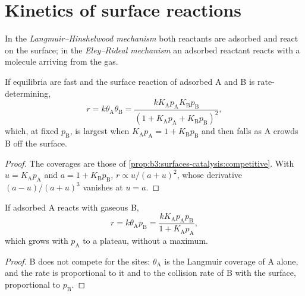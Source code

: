 \section{Kinetics of surface reactions}

\begin{definition}\label{def:b3:surfaces-catalysis:mechanisms}
In the \emph{Langmuir--Hinshelwood mechanism}
both reactants are adsorbed and react on the surface; in the
\emph{Eley--Rideal mechanism} an adsorbed reactant
reacts with a molecule arriving from the gas.
\end{definition}

\begin{proposition}\label{prop:b3:surfaces-catalysis:lh-rate}
If  equilibria are fast and the surface reaction of adsorbed A and B
is rate-determining,
\[
  r = k\theta_{\mathrm A}\theta_{\mathrm B} = \frac{kK_{\mathrm A}p_{\mathrm A}K_{\mathrm B}p_{\mathrm B}}{(1 + K_{\mathrm A}p_{\mathrm A} + K_{\mathrm B}p_{\mathrm B})^2},
\]
which, at fixed $p_{\mathrm B}$, is largest when $K_{\mathrm A}p_{\mathrm A} = 1 + K_{\mathrm B}p_{\mathrm B}$ and then falls as A crowds B off the
surface.
\end{proposition}

\begin{proof}
The coverages are those of \cref{prop:b3:surfaces-catalysis:competitive}. With $u =
K_{\mathrm A}p_{\mathrm A}$ and $a = 1 + K_{\mathrm B}p_{\mathrm B}$, $r \propto u/(a + u)^2$, whose derivative $(a - u)/(a + u)^3$ vanishes at
$u = a$.
\end{proof}

\begin{proposition}\label{prop:b3:surfaces-catalysis:er-rate}
If adsorbed A reacts with gaseous B,
\[
  r = k\theta_{\mathrm A}p_{\mathrm B} = \frac{kK_{\mathrm A}p_{\mathrm A}p_{\mathrm B}}{1 + K_{\mathrm A}p_{\mathrm A}},
\]
which grows with $p_{\mathrm A}$ to a plateau, without a maximum.
\end{proposition}

\begin{proof}
B does not compete for the sites: $\theta_{\mathrm A}$ is the Langmuir coverage of A alone, and the
rate is proportional to it and to the collision rate of B with the surface,
proportional to $p_{\mathrm B}$.
\end{proof}

